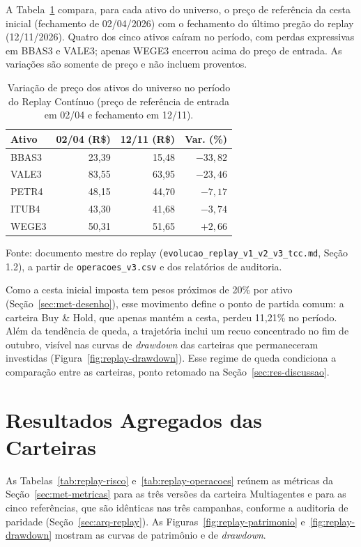A Tabela~\ref{tab:res-mercado} compara, para cada ativo do universo, o preço de referência da cesta inicial (fechamento de 02/04/2026) com o fechamento do último pregão do replay (12/11/2026). Quatro dos cinco ativos caíram no período, com perdas expressivas em BBAS3 e VALE3; apenas WEGE3 encerrou acima do preço de entrada. As variações são somente de preço e não incluem proventos.

\begin{table}[htbp]
\centering
\caption{Variação de preço dos ativos do universo no período do Replay Contínuo (preço de referência de entrada em 02/04 e fechamento em 12/11).}
\label{tab:res-mercado}
\small
\begin{tabular}{lrrr}
\toprule
\textbf{Ativo} & \textbf{02/04 (R\$)} & \textbf{12/11 (R\$)} & \textbf{Var. (\%)} \\
\midrule
BBAS3 & 23{,}39 & 15{,}48 & $-33{,}82$ \\
VALE3 & 83{,}55 & 63{,}95 & $-23{,}46$ \\
PETR4 & 48{,}15 & 44{,}70 & $-7{,}17$ \\
ITUB4 & 43{,}30 & 41{,}68 & $-3{,}74$ \\
WEGE3 & 50{,}31 & 51{,}65 & $+2{,}66$ \\
\bottomrule
\end{tabular}
\par\smallskip\footnotesize Fonte: documento mestre do replay (\texttt{evolucao\_replay\_v1\_v2\_v3\_tcc.md}, Seção 1.2), a partir de \texttt{operacoes\_v3.csv} e dos relatórios de auditoria.
\end{table}

Como a cesta inicial imposta tem pesos próximos de 20\% por ativo (Seção~\ref{sec:met-desenho}), esse movimento define o ponto de partida comum: a carteira Buy \& Hold, que apenas mantém a cesta, perdeu 11,21\% no período. Além da tendência de queda, a trajetória inclui um recuo concentrado no fim de outubro, visível nas curvas de \textit{drawdown} das carteiras que permaneceram investidas (Figura~\ref{fig:replay-drawdown}). Esse regime de queda condiciona a comparação entre as carteiras, ponto retomado na Seção~\ref{sec:res-discussao}.

\section{Resultados Agregados das Carteiras}
\label{sec:res-agregados}

As Tabelas~\ref{tab:replay-risco} e~\ref{tab:replay-operacoes} reúnem as métricas da Seção~\ref{sec:met-metricas} para as três versões da carteira Multiagentes e para as cinco referências, que são idênticas nas três campanhas, conforme a auditoria de paridade (Seção~\ref{sec:arq-replay}). As Figuras~\ref{fig:replay-patrimonio} e~\ref{fig:replay-drawdown} mostram as curvas de patrimônio e de \textit{drawdown}.

